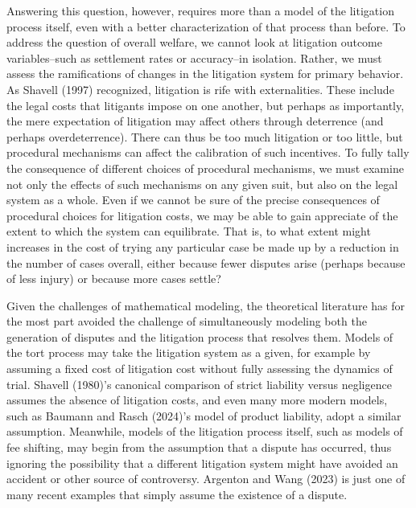 \documentclass{article}
\begin{document}
Answering this question, however, requires more than a model of the litigation process itself, even with a better characterization of that process than before. To address the question of overall welfare, we cannot look at litigation outcome variables--such as settlement rates or accuracy--in isolation. Rather, we must assess the ramifications of changes in the litigation system for primary behavior. As Shavell (1997) recognized, litigation is rife with externalities. These include the legal costs that litigants impose on one another, but perhaps as importantly, the mere expectation of litigation may affect others through deterrence (and perhaps overdeterrence). There can thus be too much litigation or too little, but procedural mechanisms can affect the calibration of such incentives. To fully tally the consequence of different choices of procedural mechanisms, we must examine not only the effects of such mechanisms on any given suit, but also on the legal system as a whole. Even if we cannot be sure of the precise consequences of procedural choices for litigation costs, we may be able to gain appreciate of the extent to which the system can equilibrate. That is, to what extent might increases in the cost of trying any particular case be made up by a reduction in the number of cases overall, either because fewer disputes arise (perhaps because of less injury) or because more cases settle?

Given the challenges of mathematical modeling, the theoretical literature has for the most part avoided the challenge of simultaneously modeling both the generation of disputes and the litigation process that resolves them. Models of the tort process may take the litigation system as a given, for example by assuming a fixed cost of litigation cost without fully assessing the dynamics of trial. Shavell (1980)'s canonical comparison of strict liability versus negligence assumes the absence of litigation costs, and even many more modern models, such as Baumann and Rasch (2024)'s model of product liability, adopt a similar assumption. Meanwhile, models of the litigation process itself, such as models of fee shifting, may begin from the assumption that a dispute has occurred, thus ignoring the possibility that a different litigation system might have avoided an accident or other source of controversy. Argenton and Wang (2023) is just one of many recent examples that simply assume the existence of a dispute. 
\end{document}
